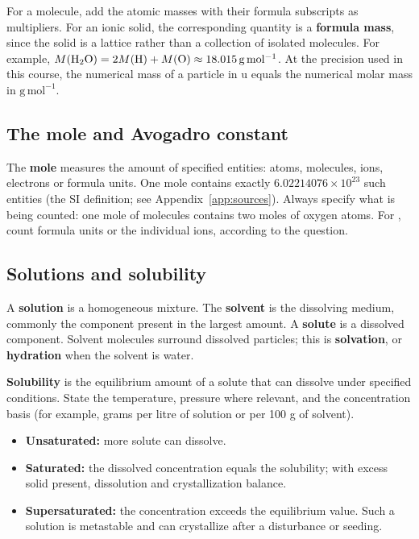 \documentclass[a4paper,10pt]{article}
\newcommand{\chemunit}[1]{\,\mathrm{#1}}
\begin{document}
For a molecule, add the atomic masses with their formula subscripts as multipliers.
For an ionic solid, the corresponding quantity is a \textbf{formula mass}, since
the solid is a lattice rather than a collection of isolated molecules.
For example, $M(\ce{H2O})=2M(\ce{H})+M(\ce{O})\approx18.015\chemunit{g\,mol^{-1}}$.
At the precision used in this course, the numerical mass of a particle in
$\mathrm u$ equals the numerical molar mass in $\mathrm{g\,mol^{-1}}$.

\subsection{The mole and Avogadro constant}
The \textbf{mole} measures the amount of specified entities: atoms, molecules,
ions, electrons or formula units. One mole contains exactly
$6.02214076\times10^{23}$ such entities (the SI definition; see
Appendix~\ref{app:sources}).
\figbox{$\displaystyle
 N_{\mathrm A}=6.02214076\times10^{23}\chemunit{mol^{-1}},\qquad
 n=\frac{N}{N_{\mathrm A}}=\frac{m}{M},\qquad N=nN_{\mathrm A}$}
Always specify what is being counted: one mole of  molecules contains two
moles of oxygen atoms. For , count formula units or the individual ions,
according to the question.

\subsection{Solutions and solubility}
A \textbf{solution} is a homogeneous mixture. The \textbf{solvent} is the dissolving
medium, commonly the component present in the largest amount. A \textbf{solute}
is a dissolved component. Solvent molecules surround dissolved particles;
this is \textbf{solvation}, or \textbf{hydration} when the solvent is water.

\textbf{Solubility} is the equilibrium amount of a solute that can dissolve under
specified conditions. State the temperature, pressure where relevant, and the
concentration basis (for example, grams per litre of solution or per 100 g of solvent).
\begin{itemize}
  \item \textbf{Unsaturated:} more solute can dissolve.
  \item \textbf{Saturated:} the dissolved concentration equals the solubility;
  with excess solid present, dissolution and crystallization balance.
  \item \textbf{Supersaturated:} the concentration exceeds the equilibrium value.
  Such a solution is metastable and can crystallize after a disturbance or seeding.
\end{itemize}
\end{document}
